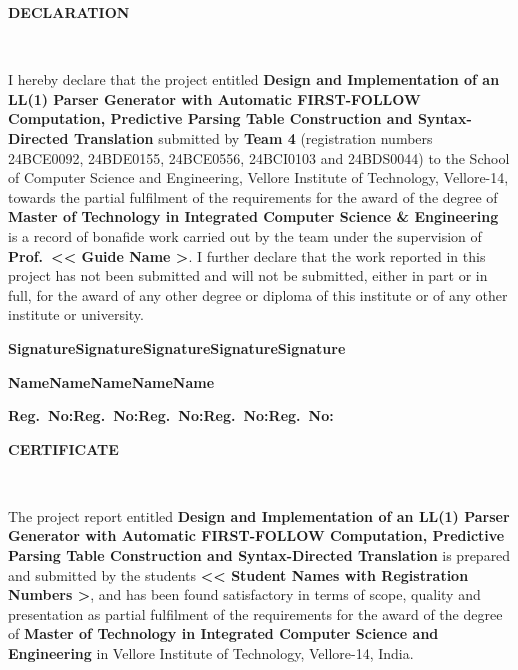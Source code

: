 \documentclass[12pt,a4paper,oneside,openany]{report}
\newcommand{\pmpage}[1]{%
  \clearpage\thispagestyle{fancy}%
  \begin{center}\bfseries\fontsize{14}{18}\selectfont #1\end{center}%
  \vspace{0.6em}}
\begin{document}
\pmpage{DECLARATION}
~\vspace{0.5em}

I hereby declare that the project entitled \textbf{Design and Implementation of
an LL(1) Parser Generator with Automatic FIRST-FOLLOW Computation, Predictive
Parsing Table Construction and Syntax-Directed Translation} submitted by
\textbf{Team 4} (registration numbers 24BCE0092, 24BDE0155, 24BCE0556,
24BCI0103 and 24BDS0044) to the School of Computer Science and Engineering,
Vellore Institute of Technology, Vellore-14, towards the partial fulfilment of
the requirements for the award of the degree of \textbf{Master of Technology in
Integrated Computer Science \& Engineering} is a record of bonafide work
carried out by the team under the supervision of \textbf{Prof.\ << Guide Name
\>>}. I further declare that the work reported in this project has not been
submitted and will not be submitted, either in part or in full, for the award
of any other degree or diploma of this institute or of any other institute or
university.

\vspace{2.4em}\noindent
\textbf{Signature}\hfill\textbf{Signature}\hfill\textbf{Signature}\hfill\textbf{Signature}\hfill\textbf{Signature}\par
\vspace{0.8em}\noindent
\textbf{Name}\hfill\textbf{Name}\hfill\textbf{Name}\hfill\textbf{Name}\hfill\textbf{Name}\par
\vspace{0.4em}\noindent
\textbf{Reg.\ No:}\hfill\textbf{Reg.\ No:}\hfill\textbf{Reg.\ No:}\hfill\textbf{Reg.\ No:}\hfill\textbf{Reg.\ No:}\par

\pmpage{CERTIFICATE}
~\vspace{0.5em}

The project report entitled \textbf{Design and Implementation of an LL(1)
Parser Generator with Automatic FIRST-FOLLOW Computation, Predictive Parsing
Table Construction and Syntax-Directed Translation} is prepared and submitted
by the students \textbf{<< Student Names with Registration Numbers \>>}, and
has been found satisfactory in terms of scope, quality and presentation as
partial fulfilment of the requirements for the award of the degree of
\textbf{Master of Technology in Integrated Computer Science and Engineering} in
Vellore Institute of Technology, Vellore-14, India.
\end{document}
